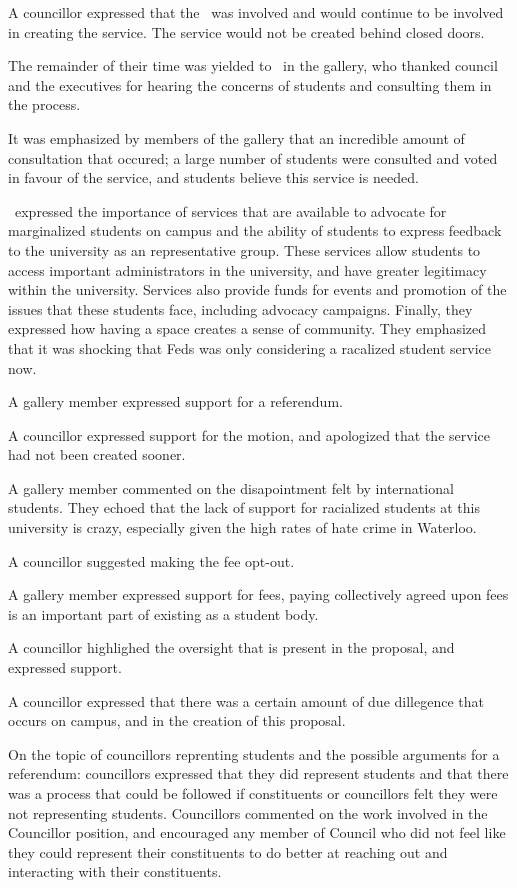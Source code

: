 \begin{motion}
    A councillor expressed that the \clac\ was involved and would continue to
    be involved in creating the service. The service would not be created 
    behind closed doors. 

    The remainder of their time was yielded to \elisa\ in the gallery, who
    thanked council and the executives for hearing the concerns of students
    and consulting them in the process. 

    It was emphasized by members of the gallery that an incredible amount of
    consultation that occured; a large number of students were consulted and
    voted in favour of the service, and students believe this service is needed.

    \amanda\ expressed the importance of services that are available to 
    advocate for marginalized students on campus and the ability of students
    to express feedback to the university as an representative group. These
    services allow students to access important administrators in the 
    university, and have greater legitimacy within the university. Services
    also provide funds for events and promotion of the issues that these 
    students face, including advocacy campaigns. Finally, they expressed how 
    having a space creates a sense of community. They emphasized that it was
    shocking that Feds was only considering a racalized student service now.

    A gallery member expressed support for a referendum.

    A councillor expressed support for the motion, and apologized that the
    service had not been created sooner. 

    A gallery member commented on the disapointment felt by international 
    students. They echoed that the lack of support for racialized students at
    this university is crazy, especially given the high rates of hate crime in
    Waterloo.

    A councillor suggested making the fee opt-out. 

    A gallery member expressed support for fees, paying collectively agreed
    upon fees is an important part of existing as a student body.

    A councillor highlighed the oversight that is present in the proposal, 
    and expressed support.

    A councillor expressed that there was a certain amount of due dillegence 
    that occurs on campus, and in the creation of this proposal. 

    On the topic of councillors reprenting students and the possible arguments
    for a referendum: councillors expressed that they did represent students
    and that there was a process that could be followed if constituents or
    councillors felt they were not representing students. Councillors
    commented on the work involved in the Councillor position, and encouraged
    any member of Council who did not feel like they could represent their
    constituents to do better at reaching out and interacting with their 
    constituents.


\end{motion}
